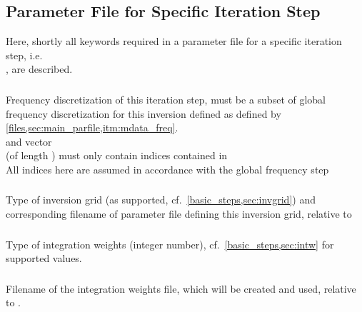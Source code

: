\subsection{Parameter File for Specific Iteration Step} \label{files,sec:iter_parfile}
%
Here, shortly all keywords required in a parameter file for a specific iteration step, i.e.\ \\
 , are described.
\subsubsection{} \label{files,sec:iter_parfile,itm:iter_freq}
Frequency discretization of this iteration step, must be a subset of global frequency discretization 
for this inversion defined as defined by \ref{files,sec:main_parfile,itm:mdata_freq}. \\
 and vector \\
 (of length )
must only contain indices contained in \\
All indices here are assumed in accordance with the global frequency step 
\subsubsection{} \label{files,sec:iter_parfile,itm:invgrid}
Type of inversion grid (as supported, cf.\ \ref{basic_steps,sec:invgrid}) and corresponding
filename of parameter file defining this inversion grid, relative to \\
\subsubsection{}
Type of integration weights (integer number), cf.\ \ref{basic_steps,sec:intw} for supported values.
\subsubsection{} 
Filename of the integration weights file, which will be created and used, relative to 
. 
